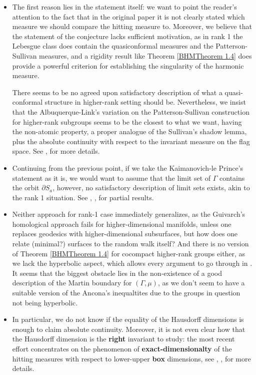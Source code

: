 \documentclass[11pt]{amsart}
\theoremstyle{definition}
\begin{document}
	\begin{itemize}
		\item The first reason lies in the statement itself: we want to point the reader's attention to the fact that in the original paper it is not clearly stated which measure we should compare the hitting measure to. Moreover, we believe that the statement of the conjecture lacks sufficient motivation, as in rank 1 the Lebesgue class does contain the quasiconformal measures and the Patterson-Sullivan measures, and a rigidity result like Theorem \ref{BHMTheorem 1.4} does provide a powerful criterion for establishing the singularity of the harmonic measure.
		
		There seems to be no agreed upon satisfactory description of what a quasi-conformal structure in higher-rank setting should be. Nevertheless, we insist that the Albuquerque-Link's variation on the Patterson-Sullivan construction for higher-rank subgroups seems to be the closest to what we want, having the non-atomic property, a proper analogue of the Sullivan's shadow lemma, plus the absolute continuity with respect to the invariant measure on the flag space. See \cite{albuq}, \cite{linkhausdorff} for more details.
		\item Continuing from the previous point, if we take the Kaimanovich-le Prince's statement as it is, we would want to assume that the limit set of $\Gamma$ contains the orbit $\partial S_a$, however, no satisfactory description of limit sets exists, akin to the rank 1 situation. See \cite{conzeguivarch}, \cite{link_limit}, \cite{Geninska2016} for partial results.
		\item Neither approach for rank-1 case immediately generalizes, as the Guivarch's homological approach fails for higher-dimensional manifolds, unless one replaces geodesics with higher-dimensional subsurfaces, but how does one relate (minimal?) surfaces to the random walk itself? And there is no version of Theorem \ref{BHMTheorem 1.4} for cocompact higher-rank groups either, as we lack the hyperbolic aspect, which allows every argument to go through in \cite{blachere2011harmonic}. It seems that the biggest obstacle lies in the non-existence of a good description of the Martin boundary for $(\Gamma, \mu)$, as we don't seem to have a suitable version of the Ancona's inequaltites due to the groups in question not being hyperbolic.
		\item In particular, we do not know if the equality of the Hausdorff dimensions is enough to claim absolute continuity. Moreover, it is not even clear how that the Hausdorff dimension is the \textbf{right} invariant to study: the most recent effort concentrates on the phenomenon of \textbf{exact-dimensionalty} of the hitting measures with respect to lower-upper \textbf{box} dimensions, see \cite{kaimanovich2011matrix}, \cite{lessaledrappier1}, \cite{ledrappier2023exact} for more details. 

\end{itemize}
\end{document}
